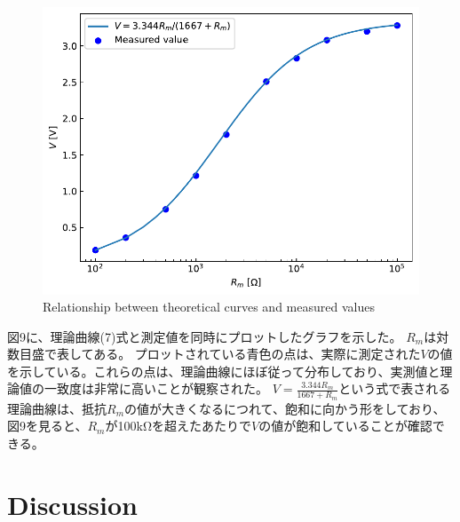 \documentclass[a4paper,10pt]{jsarticle}
\begin{document}
\begin{figure}[htbp]
  \centering
  \includegraphics[width=0.6\linewidth]{figs/tebunan.pdf}
  \caption{Relationship between theoretical curves and measured values}
  \label{fig:my_label}
\end{figure}
\vspace{2cm}

図9に、理論曲線(7)式と測定値を同時にプロットしたグラフを示した。
$R_m$は対数目盛で表してある。
プロットされている青色の点は、実際に測定された$V$の値を示している。これらの点は、理論曲線にほぼ従って分布しており、実測値と理論値の一致度は非常に高いことが観察された。
$V = \frac{3.344R_m}{1667 + R_m}$という式で表される理論曲線は、抵抗$R_m$の値が大きくなるにつれて、飽和に向かう形をしており、図9を見ると、$R_m$が100kΩを超えたあたりで$V$の値が飽和していることが確認できる。

\section{Discussion}
\end{document}
